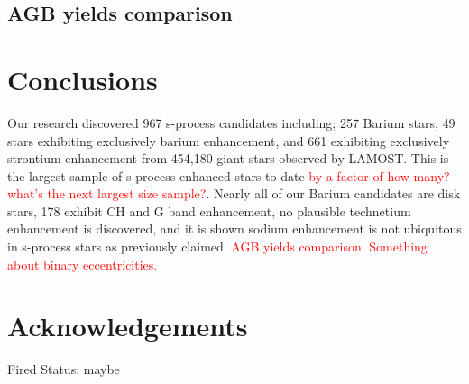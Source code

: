 \documentclass[a4paper,fleqn,usenatbib]{mnras}
\newcommand{\todo}[1]{\textcolor{red}{#1}}
\begin{document}
\subsection{AGB yields comparison}

\section{Conclusions} \label{sec:con}

Our research discovered 967 s-process candidates including; 257 Barium stars, 49 stars exhibiting exclusively barium enhancement, and 661 exhibiting exclusively strontium enhancement from 454,180 giant stars observed by LAMOST. This is the largest sample of s-process enhanced stars to date \todo{by a factor of how many? what's the next largest size sample?}. Nearly all of our Barium candidates are disk stars, 178 exhibit CH and G band enhancement, no plausible technetium enhancement is discovered, and it is shown sodium enhancement is not ubiquitous in s-process stars as previously claimed. \todo{AGB yields comparison. Something about binary eccentricities.}
\section*{Acknowledgements}

Fired Status: maybe

 

\end{document}
